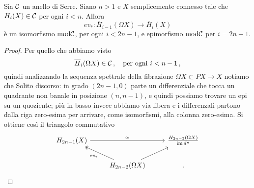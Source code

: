 \begin{prop}\label{ev-mod-c}
 	Sia $\mathcal{C}$ un anello di Serre. Siano $n > 1$ e $X$ semplicemente connesso
 	tale che $H_{i}(X) \in \mathcal{C}$ per ogni $i < n$.
 	Allora
 	\begin{equation*}
 		ev_{*} : \overline{H}_{i-1}(\Omega X) \longrightarrow \overline{H}_{i}(X)
 	\end{equation*}
 	è un isomorfismo $\mathrm{mod}\mathcal{C}$, per ogni $i < 2n-1$, e
 	epimorfismo $\mathrm{mod}\mathcal{C}$ per $i=2n-1$.
 	\begin{proof}
 		Per quello che abbiamo visto
 		\begin{equation*}
 			\overline{H}_{i}(\Omega X) \in \mathcal{C}\,, \quad \text{per ogni } i < n-1\,,
 		\end{equation*}
 		quindi analizzando la sequenza spettrale della fibrazione
 		$\Omega X \subset P X \to X$ notiamo che
 		Solito discorso: in grado $(2n-1,0)$ parte un differenziale che tocca
 		un quadrante non banale in posizione $(n,n-1)$, e quindi possiamo
 		trovare un epi su un quoziente; più in basso invece abbiamo via libera e i differenzali
 		partono dalla riga zero-esima per arrivare, come isomorfismi, alla colonna zero-esima.
 		Si ottiene così il triangolo commutativo
 		\begin{equation*}
 			\begin{tikzcd}
 				H_{2n-1}(X) \ar[rr, "\simeq"] & & \frac{H_{2n-2}(\Omega X)}{\operatorname{im}d^{n}} \\
 				& H_{2n-2}(\Omega X) \ar[ul, two heads, "ev_{*}"] \ar[ur] & \,.
 			\end{tikzcd}
 		\end{equation*}
 	\end{proof}
\end{prop}

